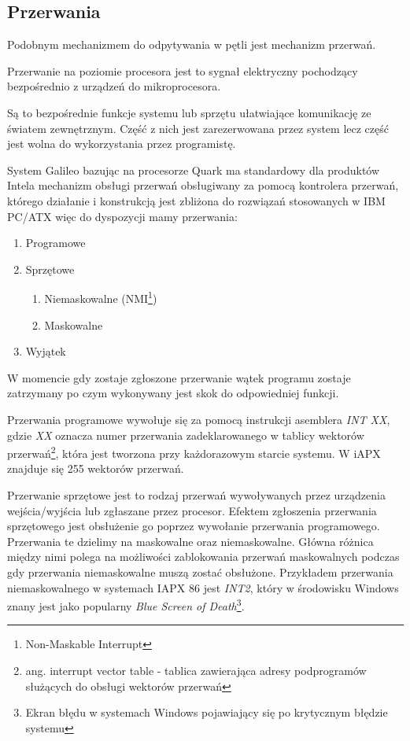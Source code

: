 \documentclass{xmgr}
\begin{document}
\subsection{Przerwania}
Podobnym mechanizmem do odpytywania w pętli jest mechanizm przerwań. 

Przerwanie na poziomie procesora jest to sygnał elektryczny pochodzący bezpośrednio z urządzeń do mikroprocesora.

Są to bezpośrednie funkcje systemu lub sprzętu ułatwiające komunikację ze światem zewnętrznym. Część z nich jest zarezerwowana przez system lecz część jest wolna do wykorzystania przez programistę.

System Galileo bazując na procesorze Quark ma standardowy dla produktów Intela mechanizm obsługi przerwań obsługiwany za pomocą kontrolera przerwań, którego działanie i konstrukcją jest zbliżona do rozwiązań stosowanych w IBM PC/ATX więc do dyspozycji mamy przerwania:
\begin{enumerate}
	\item Programowe
	\item Sprzętowe
	\begin{enumerate}
		\item Niemaskowalne (NMI\footnote{Non-Maskable Interrupt})
		\item Maskowalne
	\end{enumerate}
	\item Wyjątek
\end{enumerate}

W momencie gdy zostaje zgłoszone przerwanie wątek programu zostaje zatrzymany po czym wykonywany jest skok do odpowiedniej funkcji.

Przerwania programowe wywołuje się za pomocą instrukcji asemblera \emph{INT XX}, gdzie \emph{XX} oznacza numer przerwania zadeklarowanego w tablicy wektorów przerwań\footnote{ang. interrupt vector table - tablica zawierająca adresy podprogramów służących do obsługi wektorów przerwań}, która jest tworzona przy każdorazowym starcie systemu. W iAPX znajduje się 255 wektorów przerwań.

Przerwanie sprzętowe jest to rodzaj przerwań wywoływanych przez urządzenia wejścia/wyjścia lub zgłaszane przez procesor. Efektem zgłoszenia przerwania sprzętowego jest obsłużenie go poprzez wywołanie przerwania programowego. Przerwania te dzielimy na maskowalne oraz niemaskowalne. Główna różnica między nimi polega na możliwości zablokowania przerwań maskowalnych podczas gdy przerwania niemaskowalne muszą zostać obsłużone. Przykładem przerwania niemaskowalnego w systemach IAPX 86 jest \emph{INT2}, który w środowisku Windows znany jest jako popularny \emph{Blue Screen of Death}\footnote{Ekran błędu w systemach Windows pojawiający się po krytycznym błędzie systemu}.
\end{document}
